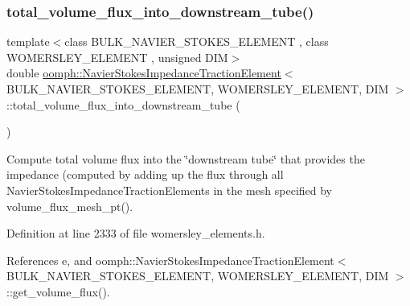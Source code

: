 \subsubsection{\texorpdfstring{total\+\_\+volume\+\_\+flux\+\_\+into\+\_\+downstream\+\_\+tube()}{total\_volume\_flux\_into\_downstream\_tube()}}
{\footnotesize\ttfamily template$<$class B\+U\+L\+K\+\_\+\+N\+A\+V\+I\+E\+R\+\_\+\+S\+T\+O\+K\+E\+S\+\_\+\+E\+L\+E\+M\+E\+NT , class W\+O\+M\+E\+R\+S\+L\+E\+Y\+\_\+\+E\+L\+E\+M\+E\+NT , unsigned D\+IM$>$ \\
double \hyperlink{classoomph_1_1NavierStokesImpedanceTractionElement}{oomph\+::\+Navier\+Stokes\+Impedance\+Traction\+Element}$<$ B\+U\+L\+K\+\_\+\+N\+A\+V\+I\+E\+R\+\_\+\+S\+T\+O\+K\+E\+S\+\_\+\+E\+L\+E\+M\+E\+NT, W\+O\+M\+E\+R\+S\+L\+E\+Y\+\_\+\+E\+L\+E\+M\+E\+NT, D\+IM $>$\+::total\+\_\+volume\+\_\+flux\+\_\+into\+\_\+downstream\+\_\+tube (\begin{DoxyParamCaption}{ }\end{DoxyParamCaption})\hspace{0.3cm}{\ttfamily [inline]}}



Compute total volume flux into the \char`\"{}downstream tube\char`\"{} that provides the impedance (computed by adding up the flux through all Navier\+Stokes\+Impedance\+Traction\+Elements in the mesh specified by volume\+\_\+flux\+\_\+mesh\+\_\+pt(). 



Definition at line 2333 of file womersley\+\_\+elements.\+h.



References e, and oomph\+::\+Navier\+Stokes\+Impedance\+Traction\+Element$<$ B\+U\+L\+K\+\_\+\+N\+A\+V\+I\+E\+R\+\_\+\+S\+T\+O\+K\+E\+S\+\_\+\+E\+L\+E\+M\+E\+N\+T, W\+O\+M\+E\+R\+S\+L\+E\+Y\+\_\+\+E\+L\+E\+M\+E\+N\+T, D\+I\+M $>$\+::get\+\_\+volume\+\_\+flux().

\mbox{\label{classoomph_1_1NavierStokesImpedanceTractionElement_ac5070c5b06b172cb7f1cb36b853e8edf}} 
